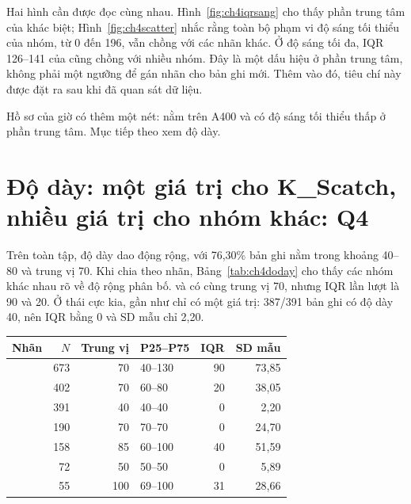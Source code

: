 Hai hình cần được đọc cùng nhau. Hình~\ref{fig:ch4iqrsang} cho thấy phần trung tâm của  khác biệt; Hình~\ref{fig:ch4scatter} nhắc rằng toàn bộ phạm vi độ sáng tối thiểu của nhóm, từ 0 đến 196, vẫn chồng với các nhãn khác. Ở độ sáng tối đa, IQR 126--141 của  cũng chồng với nhiều nhóm. Đây là một dấu hiệu ở phần trung tâm, không phải một ngưỡng để gán nhãn cho bản ghi mới. Thêm vào đó, tiêu chí này được đặt ra sau khi đã quan sát dữ liệu.

Hồ sơ của  giờ có thêm một nét: nằm trên A400 và có độ sáng tối thiểu thấp ở phần trung tâm. Mục tiếp theo xem độ dày.

\section{Độ dày: một giá trị cho K\_Scatch, nhiều giá trị cho nhóm khác: Q4}
\label{sec:ch4q4}

Trên toàn tập, độ dày dao động rộng, với 76,30\% bản ghi nằm trong khoảng 40--80 và trung vị 70. Khi chia theo nhãn, Bảng~\ref{tab:ch4doday} cho thấy các nhóm khác nhau rõ về độ rộng phân bố.  và  có cùng trung vị 70, nhưng IQR lần lượt là 90 và 20. Ở thái cực kia,  gần như chỉ có một giá trị: 387/391 bản ghi có độ dày 40, nên IQR bằng 0 và SD mẫu chỉ 2,20.

\begin{center}\begin{minipage}{\linewidth}
\label{tab:ch4doday}
\small{}
\begin{tabularx}{\linewidth}{@{}Y r r p{2.3cm}r r@{}}
\toprule
Nhãn & $N$ & Trung vị & P25--P75 & IQR & SD mẫu \\
\midrule
{} & 673 & 70 & 40--130 & 90 & 73,85 \\
 & 402 & 70 & 60--80 & 20 & 38,05 \\
 & 391 & 40 & 40--40 & 0 & 2,20 \\
 & 190 & 70 & 70--70 & 0 & 24,70 \\
 & 158 & 85 & 60--100 & 40 & 51,59 \\
 & 72 & 50 & 50--50 & 0 & 5,89 \\
 & 55 & 100 & 69--100 & 31 & 28,66 \\
\bottomrule
\end{tabularx}
\end{minipage}\end{center}

